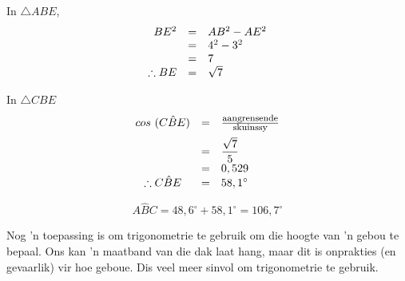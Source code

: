 \begin{wex}
{
In $\triangle ABE$, \\
\begin{equation*}
\begin{array}{ccl}
 \hfill BE^{2} &=& AB^{2} - AE^{2} \hfill \\
\hfill &=& 4^{2} - 3^{2} \hfill \\
\hfill &=&7\\
\therefore BE &=& \sqrt{7}
\end{array}
\end{equation*}

% 

In $\triangle CBE$ 
\begin{equation*}
\begin{array}{ccl}\hfill cos~(C\hat{B}E)& =& \frac{\mbox{\footnotesize aangrensende}}{\mbox{\footnotesize skuinssy}}\hfill \vspace{5pt}\\
 \hfill & =& \dfrac{\sqrt{7}}{5}\hfill \\
\hfill &=& 0,529 \hfil \\
 \therefore C\hat{B}E& =& {58,1}^{\circ }\hfill 
\end{array}
\end{equation*}

\begin{equation*}
A\hat{B}C = 48,6^{\circ} + 58,1^{\circ} = 106,7^{\circ}
\end{equation*}
}
\end{wex}



Nog 'n toepassing is om trigonometrie te gebruik om die hoogte van 'n gebou te bepaal. Ons kan 'n maatband van die dak laat hang, maar dit is onprakties (en gevaarlik) vir hoe geboue. Dis veel meer sinvol om trigonometrie te gebruik.\par 

